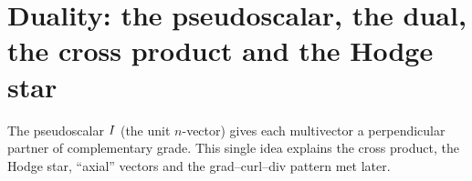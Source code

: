\section{Duality: the pseudoscalar, the dual, the cross product and the Hodge star}\label{sec:duality}

The pseudoscalar $I$ (the unit $n$-vector) gives each multivector a perpendicular partner of complementary grade. This
single idea explains the cross product, the Hodge star, ``axial'' vectors and the grad--curl--div pattern met later.




